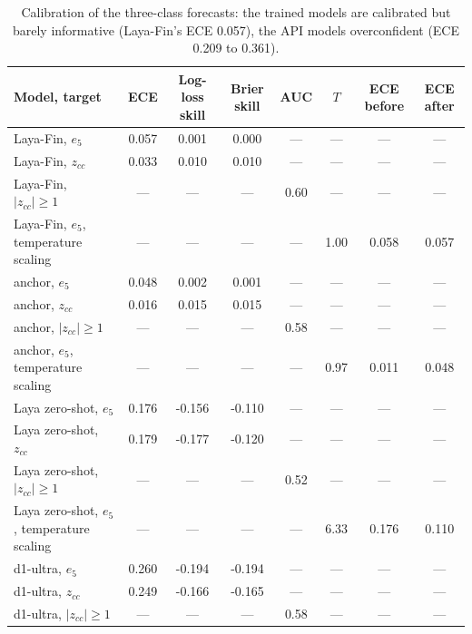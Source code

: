 \begin{table}[htbp]
\centering
\small
\begin{threeparttable}
\caption{Calibration of the three-class forecasts: the trained models are calibrated but barely informative (Laya-Fin's ECE 0.057), the API models overconfident (ECE 0.209 to 0.361).}\label{tab:a-calibration}
\begin{tabular}{@{}>{\raggedright\arraybackslash}p{1.6in}S[table-format=1.3]S[table-format=-1.3]S[table-format=-1.3]S[table-format=1.2]S[table-format=1.2]S[table-format=1.3]S[table-format=1.3]@{}}
\toprule
Model, target & {ECE} & {Log-loss skill} & {Brier skill} & {AUC} & {$T$} & {ECE before} & {ECE after} \\
\midrule
Laya-Fin, $e_5$ & 0.057 & 0.001 & 0.000 & {---} & {---} & {---} & {---} \\
Laya-Fin, $z_{cc}$ & 0.033 & 0.010 & 0.010 & {---} & {---} & {---} & {---} \\
Laya-Fin, $|z_{cc}| \geq 1$ & {---} & {---} & {---} & 0.60 & {---} & {---} & {---} \\
Laya-Fin, $e_5$, temperature scaling & {---} & {---} & {---} & {---} & 1.00 & 0.058 & 0.057 \\
anchor, $e_5$ & 0.048 & 0.002 & 0.001 & {---} & {---} & {---} & {---} \\
anchor, $z_{cc}$ & 0.016 & 0.015 & 0.015 & {---} & {---} & {---} & {---} \\
anchor, $|z_{cc}| \geq 1$ & {---} & {---} & {---} & 0.58 & {---} & {---} & {---} \\
anchor, $e_5$, temperature scaling & {---} & {---} & {---} & {---} & 0.97 & 0.011 & 0.048 \\
Laya zero-shot, $e_5$ & 0.176 & -0.156 & -0.110 & {---} & {---} & {---} & {---} \\
Laya zero-shot, $z_{cc}$ & 0.179 & -0.177 & -0.120 & {---} & {---} & {---} & {---} \\
Laya zero-shot, $|z_{cc}| \geq 1$ & {---} & {---} & {---} & 0.52 & {---} & {---} & {---} \\
Laya zero-shot, $e_5$, temperature scaling & {---} & {---} & {---} & {---} & 6.33 & 0.176 & 0.110 \\
d1-ultra, $e_5$ & 0.260 & -0.194 & -0.194 & {---} & {---} & {---} & {---} \\
d1-ultra, $z_{cc}$ & 0.249 & -0.166 & -0.165 & {---} & {---} & {---} & {---} \\
d1-ultra, $|z_{cc}| \geq 1$ & {---} & {---} & {---} & 0.58 & {---} & {---} & {---} \\

\end{tabular}
\end{threeparttable}
\end{table}
